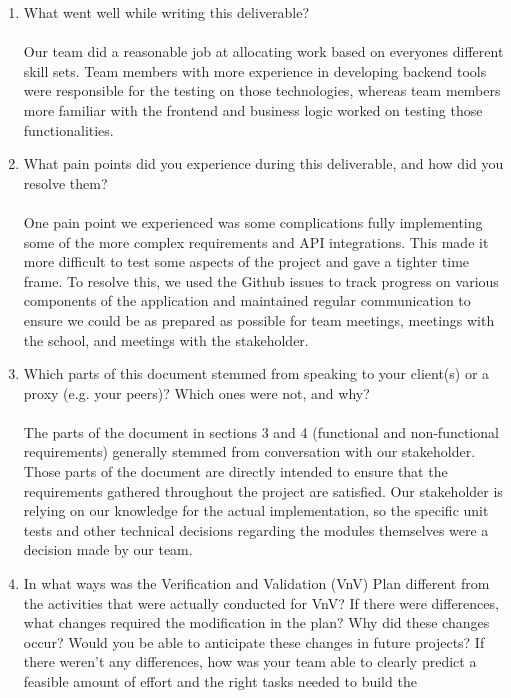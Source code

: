 \documentclass[12pt, titlepage]{article}
\begin{document}
\begin{enumerate}
  \item What went well while writing this deliverable?\\
    \\
    Our team did a reasonable job at allocating work based on
    everyones different skill sets. Team members with more experience in
    developing backend tools were responsible for the testing on
    those technologies, whereas team members more familiar with the frontend
    and business logic worked on testing those functionalities.
  \item What pain points did you experience during this deliverable, and how
    did you resolve them?\\
    \\
    One pain point we experienced was some complications fully
    implementing some of the more complex requirements and API integrations.
    This made it more difficult to test some aspects of the project
    and gave a tighter time frame. To resolve this, we used the Github
    issues to track progress on various components of the application
    and maintained regular communication to ensure we could
    be as prepared as possible for team meetings, meetings with the
    school, and meetings with the stakeholder.
  \item Which parts of this document stemmed from speaking to your client(s) or
    a proxy (e.g. your peers)? Which ones were not, and why?\\
    \\
    The parts of the document in sections 3 and 4 (functional and
    non-functional requirements) generally stemmed from conversation
    with our stakeholder. Those parts of the document are directly
    intended to ensure that the requirements gathered throughout the project
    are satisfied. Our stakeholder is relying on our knowledge for
    the actual implementation, so the specific unit tests and other technical
    decisions regarding the modules themselves were a decision made by our team.
  \item In what ways was the Verification and Validation (VnV) Plan different
    from the activities that were actually conducted for VnV?  If there were
    differences, what changes required the modification in the plan?  Why did
    these changes occur?  Would you be able to anticipate these
    changes in future
    projects?  If there weren't any differences, how was your team
    able to clearly
    predict a feasible amount of effort and the right tasks needed to build the

\end{enumerate}
\end{document}
